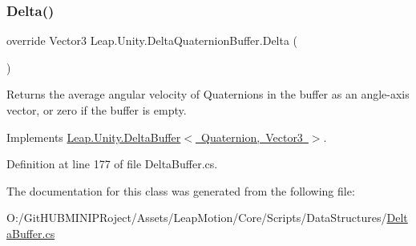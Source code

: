 \subsubsection{\texorpdfstring{Delta()}{Delta()}}
{\footnotesize\ttfamily override Vector3 Leap.\+Unity.\+Delta\+Quaternion\+Buffer.\+Delta (\begin{DoxyParamCaption}{ }\end{DoxyParamCaption})\hspace{0.3cm}{\ttfamily [virtual]}}



Returns the average angular velocity of Quaternions in the buffer as an angle-\/axis vector, or zero if the buffer is empty. 



Implements \mbox{\hyperlink{class_leap_1_1_unity_1_1_delta_buffer_a8700bc7a1676ba39977f58debf74f5df}{Leap.\+Unity.\+Delta\+Buffer$<$ Quaternion, Vector3 $>$}}.



Definition at line 177 of file Delta\+Buffer.\+cs.



The documentation for this class was generated from the following file\+:\begin{DoxyCompactItemize}
\item 
O\+:/\+Git\+H\+U\+B\+M\+I\+N\+I\+P\+Roject/\+Assets/\+Leap\+Motion/\+Core/\+Scripts/\+Data\+Structures/\mbox{\hyperlink{_delta_buffer_8cs}{Delta\+Buffer.\+cs}}\end{DoxyCompactItemize}
